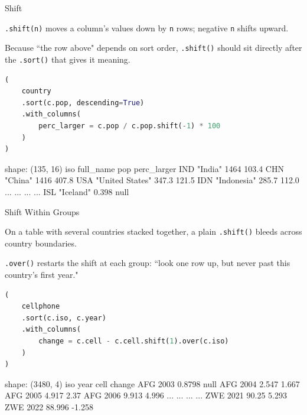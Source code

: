 \documentclass[8pt,aspectratio=169]{beamer}
\begin{document}
\begin{frame}[fragile]{Shift}
\begin{splitcode}{%

\texttt{.shift(n)} moves a column's values down by \texttt{n} rows; negative \texttt{n} shifts upward.

Because ``the row above" depends on sort order, \texttt{.shift()} should sit directly after the \texttt{.sort()} that gives it meaning.

}
\begin{lstlisting}[language=Python]
(
    country
    .sort(c.pop, descending=True)
    .with_columns(
        perc_larger = c.pop / c.pop.shift(-1) * 100
    )
)
\end{lstlisting}
\begin{codeoutput}
shape: (135, 16)
iso  full_name        pop     perc_larger
IND  "India"          1464    103.4
CHN  "China"          1416    407.8
USA  "United States"  347.3   121.5
IDN  "Indonesia"      285.7   112.0
...  ...              ...     ...
ISL  "Iceland"        0.398   null
\end{codeoutput}
\end{splitcode}
\end{frame}

\begin{frame}[fragile]{Shift Within Groups}
\begin{splitcode}{%

On a table with several countries stacked together, a plain \texttt{.shift()} bleeds across country boundaries.

\texttt{.over()} restarts the shift at each group: ``look one row up, but never past this country's first year."

}
\begin{lstlisting}[language=Python]
(
    cellphone
    .sort(c.iso, c.year)
    .with_columns(
        change = c.cell - c.cell.shift(1).over(c.iso)
    )
)
\end{lstlisting}
\begin{codeoutput}
shape: (3480, 4)
iso  year  cell     change
AFG  2003  0.8798   null
AFG  2004  2.547    1.667
AFG  2005  4.917    2.37
AFG  2006  9.913    4.996
...  ...   ...      ...
ZWE  2021  90.25    5.293
ZWE  2022  88.996   -1.258
\end{codeoutput}
\end{splitcode}
\end{frame}
\end{document}
